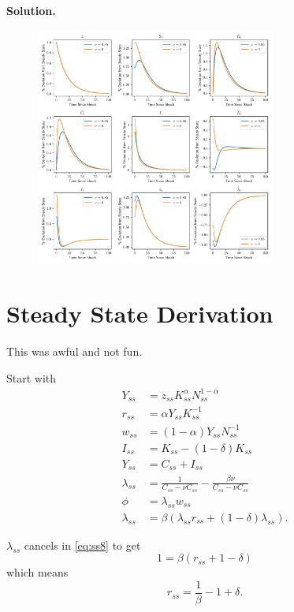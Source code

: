 \documentclass[11pt]{article}
\numberwithin{equation}{section} %
\numberwithin{figure}{section} %
\numberwithin{table}{section} %
\theoremstyle{definition}
\newenvironment{solution}{\begin{addmargin}[2em]{0em} {\bf Solution. }}{\end{addmargin}}
\begin{document}
\begin{solution}
    \begin{figure}[H]
        \centering
        \includegraphics[width=0.7\textwidth]{./graphs/nu_vs_no_nu.pdf}
    \end{figure}
\end{solution}


\clearpage
\appendix
\appendixpage

\section{Steady State Derivation}\label{sec:ss}

This was awful and not fun.

Start with 
\begin{align}
    Y_{ss} &= z_{ss} K_{ss}^\alpha N_{ss}^{1-\alpha} \label{eq:ss1} \\
    r_{ss} &= \alpha Y_{ss} K_{ss}^{-1} \label{eq:ss2} \\
    w_{ss} &= (1 - \alpha) Y_{ss} N_{ss}^{-1} \label{eq:ss3} \\
    I_{ss} &= K_{ss} - (1 - \delta) K_{ss} \label{eq:ss4} \\
    Y_{ss} &= C_{ss} + I_{ss} \label{eq:ss5} \\
    \lambda_{ss} &= \frac{1}{C_{ss} - \nu C_{ss}} - \frac{\beta \nu}{C_{ss} - \nu C_{ss}} \label{eq:ss6} \\
    \phi &= \lambda_{ss} w_{ss} \label{eq:ss7} \\
    \lambda_{ss} &= \beta(\lambda_{ss} r_{ss} + (1-\delta) \lambda_{ss}). \label{eq:ss8}
\end{align}

$\lambda_{ss}$ cancels in \ref{eq:ss8} to get
\[
    1 = \beta (r_{ss} + 1 - \delta)
\]
which means
\[
    r_{ss} = \frac{1}{\beta} - 1 + \delta.
\]
\end{document}
